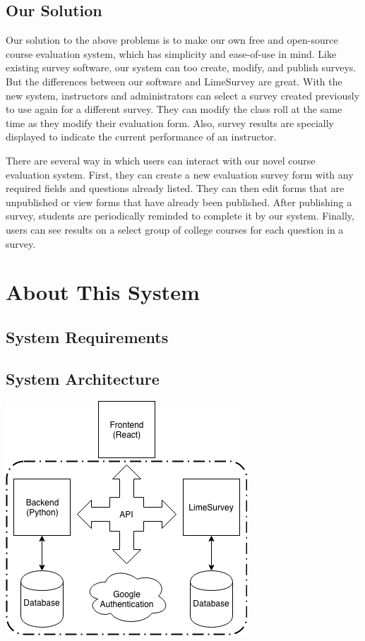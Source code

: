 \documentclass{article}
\begin{document}
\subsection{Our Solution}

Our solution to the above problems is to make our own free and open-source course evaluation system, which has simplicity and ease-of-use in mind. Like existing survey software, our system can too create, modify, and publish surveys. But the differences between our software and LimeSurvey are great. With the new system, instructors and administrators can select a survey created previously to use again for a different survey. They can modify the class roll at the same time as they modify their evaluation form. Also, survey results are specially displayed to indicate the current performance of an instructor.

There are several way in which users can interact with our novel course evaluation system. First, they can create a new evaluation survey form with any required fields and questions already listed. They can then edit forms that are unpublished or view forms that have already been published. After publishing a survey, students are periodically reminded to complete it by our system. Finally, users can see results on a select group of college courses for each question in a survey.

\section{About This System}

\subsection{System Requirements}

\subsection{System Architecture}

\begin{center}
\vspace{2mm}
\label{fig:componentdiagram}
{\includegraphics[scale=.75]{images/component_diagram.png}} 
\end{center}
\end{document}
